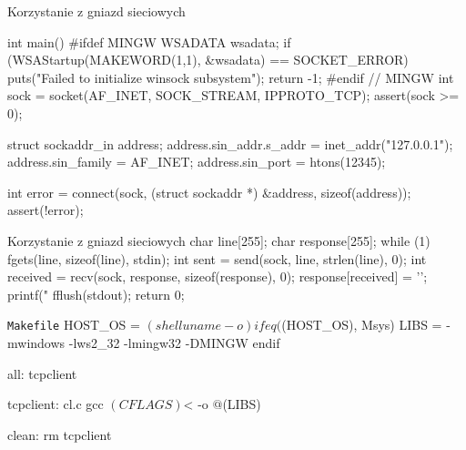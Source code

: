\documentclass{beamer}
\newenvironment{Snippet}{\Verbatim[samepage=true,fontsize=\footnotesize]}{\endVerbatim}
\begin{document}
\begin{frame}[fragile]{Korzystanie z gniazd sieciowych}
  \begin{Snippet}
    
int main() {
#ifdef MINGW
  WSADATA wsadata;
  if (WSAStartup(MAKEWORD(1,1), &wsadata) == SOCKET_ERROR) {
    puts("Failed to initialize winsock subsystem");
    return -1;
  }
#endif // MINGW
  \end{Snippet}
  \pause
  \begin{Snippet}
  int sock = socket(AF_INET, SOCK_STREAM, IPPROTO_TCP);
  assert(sock >= 0);

  struct sockaddr_in address;
  address.sin_addr.s_addr = inet_addr("127.0.0.1");
  address.sin_family = AF_INET;
  address.sin_port = htons(12345);

  int error = connect(sock, (struct sockaddr *) &address,
                      sizeof(address));
  assert(!error);
  \end{Snippet}
\end{frame}
  
\begin{frame}[fragile]{Korzystanie z gniazd sieciowych}
  \begin{Snippet}
      char line[255];
      char response[255];
      while (1) {
        fgets(line, sizeof(line), stdin);
        int sent = send(sock, line, strlen(line), 0);
        int received = recv(sock, response,
                            sizeof(response), 0);
        response[received] = '\0';
        printf("%
        fflush(stdout);
      }
      return 0;
    }
  \end{Snippet}
\end{frame}

\begin{frame}[fragile]{\texttt{Makefile}}
  \begin{Snippet}
    HOST_OS = $(shell uname -o)

    ifeq ($(HOST_OS), Msys)
      LIBS = -mwindows -lws2_32 -lmingw32 -DMINGW
    endif

    all: tcpclient

    tcpclient: cl.c
        gcc $(CFLAGS) $< -o $@ $(LIBS)

    clean:
        rm tcpclient
  \end{Snippet}
\end{frame}
    
\end{document}
